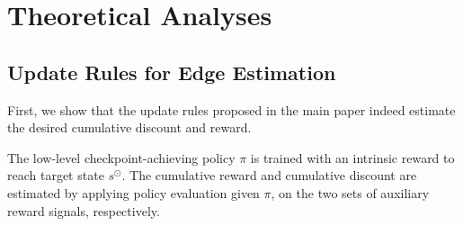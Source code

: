 
\section{Theoretical Analyses}
\subsection{Update Rules for Edge Estimation}
\label{sec:proof_update}
First, we show that the update rules proposed in the main paper indeed estimate the desired cumulative discount and reward.

The low-level checkpoint-achieving policy $\pi$ is trained with an intrinsic reward to reach target state $s^{\odot}$.
The cumulative reward and cumulative discount are estimated by applying policy evaluation given $\pi$, on the two sets of auxiliary reward signals, respectively.

